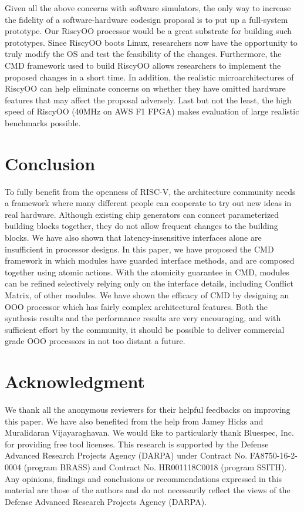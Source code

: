 \documentclass[conference]{IEEEtran}
\begin{document}
Given all the above concerns with software simulators, the only way to increase the fidelity of a software-hardware codesign proposal is to put up a full-system prototype.
Our RiscyOO processor would be a great substrate for building such prototypes.
Since RiscyOO boots Linux, researchers now have the opportunity to truly modify the OS and test the feasibility of the changes.
Furthermore, the CMD framework used to build RiscyOO allows researchers to implement the proposed changes in a short time.
In addition, the realistic microarchitectures of RiscyOO can help eliminate concerns on whether they have omitted hardware features that may affect the proposal adversely.
Last but not the least, the high speed of RiscyOO (40MHz on AWS F1 FPGA) makes evaluation of large realistic benchmarks possible.


\section{Conclusion}\label{sec:conclude}
To fully benefit from the openness of RISC-V, the architecture community needs a framework where many different people can cooperate to try out new ideas in real hardware.
Although existing chip generators can connect parameterized building blocks together,  they do not allow frequent changes to the building blocks.
We have also shown that latency-insensitive interfaces alone are insufficient in processor designs.
In this paper, we have proposed the CMD framework in which modules have guarded interface methods, and are composed together using atomic actions. 
With the atomicity guarantee in CMD, modules can be refined selectively relying only on the interface details, including Conflict Matrix, of other modules.
We have shown the efficacy of CMD by designing an OOO processor which has fairly complex architectural features.
Both the synthesis results and the performance results are very encouraging, and with sufficient effort by the community, it should be possible to deliver commercial grade OOO processors in not too distant a future.


\section*{Acknowledgment}
We thank all the anonymous reviewers for their helpful feedbacks on improving this paper.
We have also benefited from the help from Jamey Hicks and Muralidaran Vijayaraghavan.
We would like to particularly thank Bluespec, Inc. for providing free tool licenses.
This research is supported by the Defense Advanced Research Projects Agency (DARPA) under Contract No. FA8750-16-2-0004 (program BRASS) and Contract No. HR001118C0018 (program SSITH).
Any opinions, findings and conclusions or recommendations expressed in this material are those of the authors and do not necessarily reflect the views of the Defense Advanced Research Projects Agency (DARPA).




\end{document}
